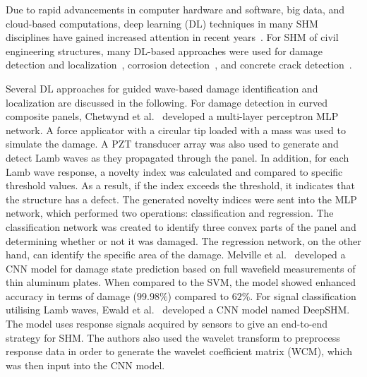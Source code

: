 \documentclass[runningheads]{llncs}
\begin{document}

Due to rapid advancements in computer hardware and software, big data, and cloud-based computations, deep learning (DL) techniques in many SHM disciplines have gained increased attention in recent years~\cite{Azimi}.
For SHM of civil engineering structures, many DL-based approaches were used for damage detection and localization~\cite{Cha2018}, corrosion detection~\cite{Atha2018}, and concrete crack detection~\cite{Dung2019}.

Several DL approaches for guided wave-based damage identification and localization are discussed in the following.
For damage detection in curved composite panels, Chetwynd et al.~\cite{Chetwynd2008} developed a multi-layer perceptron MLP network.
A force applicator with a circular tip loaded with a mass was used to simulate the damage.
A PZT transducer array was also used to generate and detect Lamb waves as they propagated through the panel.
In addition, for each Lamb wave response, a novelty index was calculated and compared to specific threshold values.
As a result, if the index exceeds the threshold, it indicates that the structure has a defect.
The generated novelty indices were sent into the MLP network, which performed two operations: classification and regression.
The classification network was created to identify three convex parts of the panel and determining whether or not it was damaged.
The regression network, on the other hand, can identify the specific area of the damage.
Melville et al.~\cite{Melville2018} developed a CNN model for damage state prediction based on full wavefield measurements of thin aluminum plates.
When compared to the SVM, the model showed enhanced accuracy in terms of damage (\(99.98\%\)) compared to \(62\%\).
For signal classification utilising Lamb waves, Ewald et al.~\cite{Ewald2019} developed a CNN model named DeepSHM.
The model uses response signals acquired by sensors to give an end-to-end strategy for SHM.
The authors also used the wavelet transform to preprocess response data in order to generate the wavelet coefficient matrix (WCM), which was then input into the CNN model.
\end{document}
